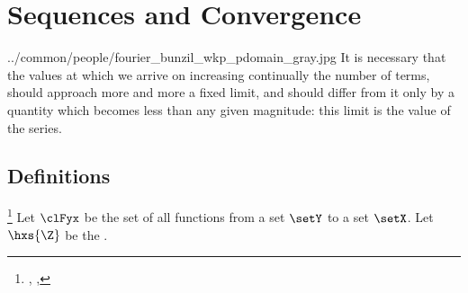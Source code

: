 ﻿%
\chapter{Sequences and Convergence}
\label{chp:seq}
  {../common/people/fourier_bunzil_wkp_pdomain_gray.jpg}
  {%
  It is necessary
  that the values at which we arrive on increasing continually the
  number of terms, should approach more and more a fixed limit,
  and should differ from it only by a quantity which becomes less
  than any given magnitude: this limit is the value of the series.%
  }
\section{Definitions}
\begin{definition}
\label{def:sequence}
\label{def:seq}
\footnote{
  ,
  ,
  }
\label{def:tuple}
Let $\clFyx$ be the set of all functions from a set $\setY$ to a set $\setX$.
Let $\hxs{\Z}$ be the .
\end{definition}

